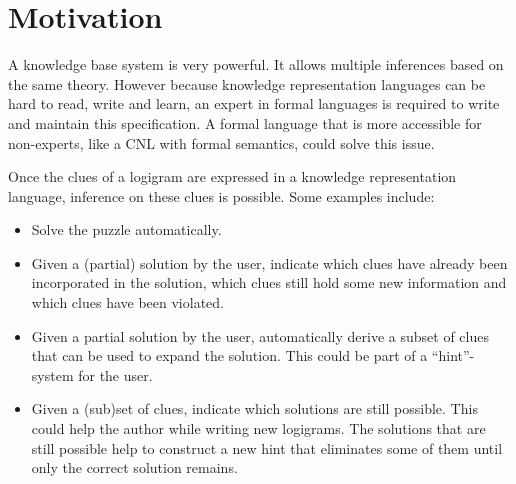 \section{Motivation}
A knowledge base system is very powerful. It allows multiple inferences based on the same theory. However because knowledge representation languages can be hard to read, write and learn, an expert in formal languages is required to write and maintain this specification. A formal language that is more accessible for non-experts, like a CNL with formal semantics, could solve this issue.

Once the clues of a logigram are expressed in a knowledge representation language, inference on these clues is possible. Some examples include:
\begin{itemize}
  \item Solve the puzzle automatically.
  \item Given a (partial) solution by the user, indicate which clues have already been incorporated in the solution, which clues still hold some new information and which clues have been violated.
  \item Given a partial solution by the user, automatically derive a subset of clues that can be used to expand the solution. This could be part of a ``hint''-system for the user.
  \item Given a (sub)set of clues, indicate which solutions are still possible. This could help the author while writing new logigrams. The solutions that are still possible help to construct a new hint that eliminates some of them until only the correct solution remains.
\end{itemize}
